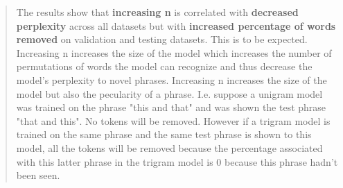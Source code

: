 \begin{quote}
    The results show that {\bf increasing n} is correlated with {\bf decreased perplexity} across all datasets but with {\bf increased percentage of words removed} on validation and testing datasets. This is to be expected. Increasing n increases the size of the model which increases the number of permutations of words the model can recognize and thus decrease the model's perplexity to novel phrases. Increasing n increases the size of the model but also the pecularity of a phrase. I.e. suppose a unigram model was trained on the phrase "this and that" and was shown the test phrase "that and this". No tokens will be removed. However if a trigram model is trained on the same phrase and the same test phrase is shown to this model, all the tokens will be removed because the percentage associated with this latter phrase in the trigram model is 0 because this phrase hadn't been seen.
\end{quote}
